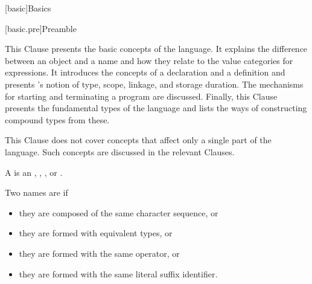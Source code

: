 [basic]{Basics}


[basic.pre]{Preamble}
%
%
%
%
%

\pnum
\begin{note}
This Clause presents the basic concepts of the \Cpp{} language.
It explains the difference between an object and a
name and how they relate to the value categories for expressions.
It introduces the concepts of a
declaration and a definition and presents \Cpp{}'s
notion of type, scope, linkage, and
storage duration. The mechanisms for starting and
terminating a program are discussed. Finally, this Clause presents the
fundamental types of the language and lists the ways of constructing
compound types from these.
\end{note}

\pnum
\begin{note}
This Clause does not cover concepts that affect only a single
part of the language. Such concepts are discussed in the relevant
Clauses.
\end{note}

\pnum
A  is an ,
,
, or
.

\pnum
Two names are  if
\begin{itemize}
\item they are  composed of the same character sequence, or
\item they are  formed with
equivalent types, or
\item they are  formed with
the same operator, or
\item they are  formed with
the same literal suffix identifier.
\end{itemize}

